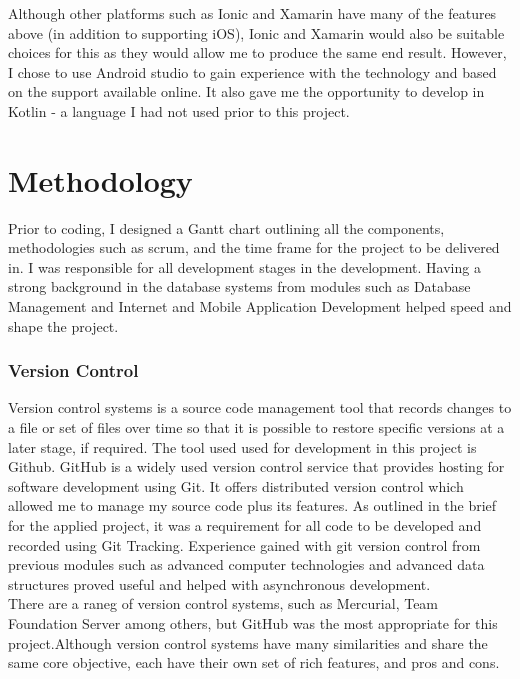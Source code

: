Although other platforms such as Ionic and Xamarin have many of the features above (in addition to supporting iOS), Ionic and Xamarin would also be suitable choices for this as they would allow me to produce the same end result. However, I chose to use Android studio to gain experience with the technology and based on the support available online. It also gave me the opportunity to develop in Kotlin - a language I had not used prior to this project.



     
\chapter{Methodology}

Prior to coding, I designed a Gantt chart outlining all the components, methodologies  such as scrum, and the time frame for the project to be delivered in. I was responsible for all development stages in the development. Having a strong background in the database systems from modules such as  Database Management and Internet and Mobile Application Development helped speed and shape the project.






    \subsection{Version Control}
Version control systems is a source code management tool that records changes to a file or set of files over time so that it is possible to restore specific versions at a later stage, if required. The tool used used for development in this project is Github. GitHub is a widely used version control service that provides hosting for software development using Git. It offers distributed version control which allowed me to manage my source code plus its features. As outlined in the brief for the applied project, it was a requirement for all code to be developed and recorded using Git Tracking. Experience gained with git version control from previous modules such as advanced computer technologies and  advanced data structures proved useful and helped with asynchronous development.\\ 
   
   There are a raneg of version control systems, such as Mercurial, Team Foundation Server among others, but GitHub was the most appropriate for this project.Although version control systems have many similarities and share the same core objective, each have their own set of rich features, and pros and cons.
   \\
   

